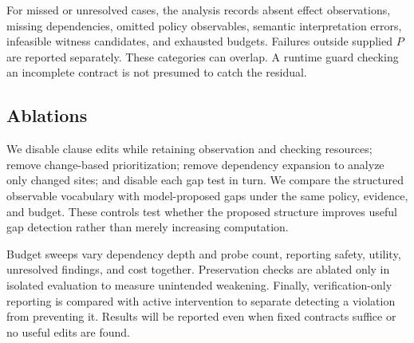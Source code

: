 For missed or unresolved cases, the analysis records absent effect observations, missing dependencies, omitted policy observables, semantic interpretation errors, infeasible witness candidates, and exhausted budgets. Failures outside supplied \(P\) are reported separately. These categories can overlap. A runtime guard checking an incomplete contract is not presumed to catch the residual.

\subsection{Ablations}
We disable clause edits while retaining observation and checking resources; remove change-based prioritization; remove dependency expansion to analyze only changed sites; and disable each gap test in turn. We compare the structured observable vocabulary with model-proposed gaps under the same policy, evidence, and budget. These controls test whether the proposed structure improves useful gap detection rather than merely increasing computation.

Budget sweeps vary dependency depth and probe count, reporting safety, utility, unresolved findings, and cost together. Preservation checks are ablated only in isolated evaluation to measure unintended weakening. Finally, verification-only reporting is compared with active intervention to separate detecting a violation from preventing it. Results will be reported even when fixed contracts suffice or no useful edits are found.
